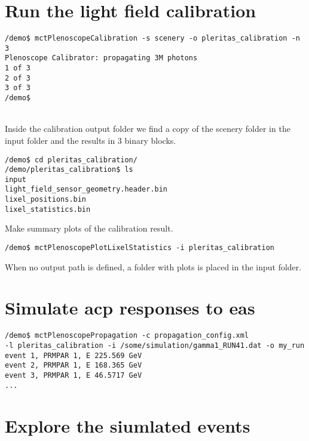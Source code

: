 \section{Run the light field calibration}
%
\begin{minipage}{\linewidth}%
\begin{lstlisting}[style=MctBash]
/demo$ mctPlenoscopeCalibration -s scenery -o pleritas_calibration -n 3
Plenoscope Calibrator: propagating 3M photons
1 of 3
2 of 3
3 of 3
/demo$ 
\end{lstlisting}
\end{minipage}\\
%
Inside the calibration output folder we find a copy of the scenery folder in the input folder and the results in 3 binary blocks.\\
%
\begin{minipage}{\linewidth}%
\begin{lstlisting}[style=MctBash]
/demo$ cd pleritas_calibration/
/demo/pleritas_calibration$ ls
input  
light_field_sensor_geometry.header.bin  
lixel_positions.bin  
lixel_statistics.bin
\end{lstlisting}
\end{minipage}%
%
Make summary plots of the calibration result.
\begin{minipage}{\linewidth}%
\begin{lstlisting}[style=MctBash]
/demo$ mctPlenoscopePlotLixelStatistics -i pleritas_calibration
\end{lstlisting}
\end{minipage}%
%
When no output path is defined, a folder with plots is placed in the input folder.
%
\section{Simulate \ac{acp} responses to \ac{eas}}
%
\begin{lstlisting}[style=MctBash]
/demo$ mctPlenoscopePropagation -c propagation_config.xml 
-l pleritas_calibration -i /some/simulation/gamma1_RUN41.dat -o my_run
event 1, PRMPAR 1, E 225.569 GeV
event 2, PRMPAR 1, E 168.365 GeV
event 3, PRMPAR 1, E 46.5717 GeV
...
\end{lstlisting}
\section{Explore the siumlated events}

